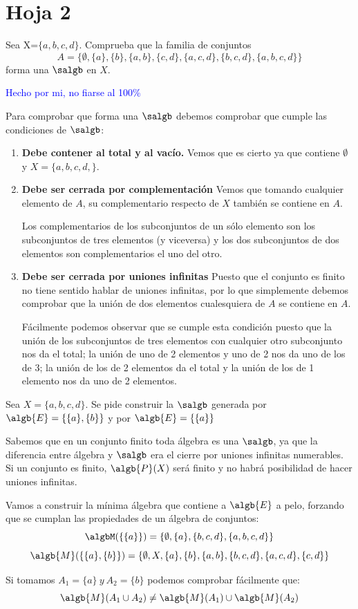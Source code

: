 \section{Hoja 2}
\begin{problem}[1]
Sea X=$\{a,b,c,d\}$. Comprueba que la familia de conjuntos
\[A = \{\emptyset, \{a\}, \{b\}, \{a,b\},\{c,d\},\{a,c,d\},\{b,c,d\}, \{a,b,c,d\}\}\]
forma una $\salgb$ en $X$.

\solution
\textcolor{blue}{Hecho por mi, no fiarse al 100\%}

Para comprobar que forma una $\salgb$ debemos comprobar que cumple las condiciones de $\salgb$:

\begin{enumerate}
\item \textbf{Debe contener al total y al vacío.}
Vemos que es cierto ya que contiene $\emptyset$ y $X=\{a,b,c,d,\}$.

\item \textbf{Debe ser cerrada por complementación}
Vemos que tomando cualquier elemento de $A$, su complementario respecto de $X$ también se contiene en $A$.

Los complementarios de los subconjuntos de un sólo elemento son los subconjuntos de tres elementos (y viceversa) y los dos subconjuntos de dos elementos son complementarios el uno del otro.

\item \textbf{Debe ser cerrada por uniones infinitas}
Puesto que el conjunto es finito no tiene sentido hablar de uniones infinitas, por lo que simplemente debemos comprobar que la unión de dos elementos cualesquiera de $A$ se contiene en $A$.

Fácilmente podemos observar que se cumple esta condición puesto que la unión de los subconjuntos de tres elementos con cualquier otro subconjunto nos da el total; la unión de uno de 2 elementos y uno de 2 nos da uno de los de 3; la unión de los de 2 elementos da el total y la unión de los de 1 elemento nos da uno de 2 elementos.
\end{enumerate}

\end{problem}
\begin{problem}[2]
Sea $X=\{a,b,c,d\}$. Se pide construir la $\salgb$ generada por $\algb{E}=\{\{a\},\{b\}\}$ y por $\algb{E}=\{\{a\}\}$

\solution
Sabemos que en un conjunto finito toda álgebra es una $\salgb$, ya que la diferencia entre álgebra y $\salgb$ era el cierre por uniones infinitas numerables. Si un conjunto es finito, $\algb{P}(X)$ será finito y no habrá posibilidad de hacer uniones infinitas.

Vamos a construir la mínima álgebra que contiene a $\algb{E}$ a pelo, forzando que se cumplan las propiedades de un álgebra de conjuntos:
\[\algbM(\{\{a\}\}) = \{\emptyset, \{a\}, \{b,c,d\}, \{a,b,c,d\}\}\]
\[\algb{M}(\{\{a\},\{b\}\})=\{\emptyset, X, \{a\}, \{b\}, \{a,b\}, \{b,c,d\}, \{a,c,d\}, \{c,d\}\}\]

\obs Si tomamos $A_1=\{a\} \ y \ A_2 = \{b\}$ podemos comprobar fácilmente que:
\[\algb{M}(A_1 \cup A_2) \neq \algb{M}(A_1) \cup \algb{M}(A_2)\]
\end{problem}

